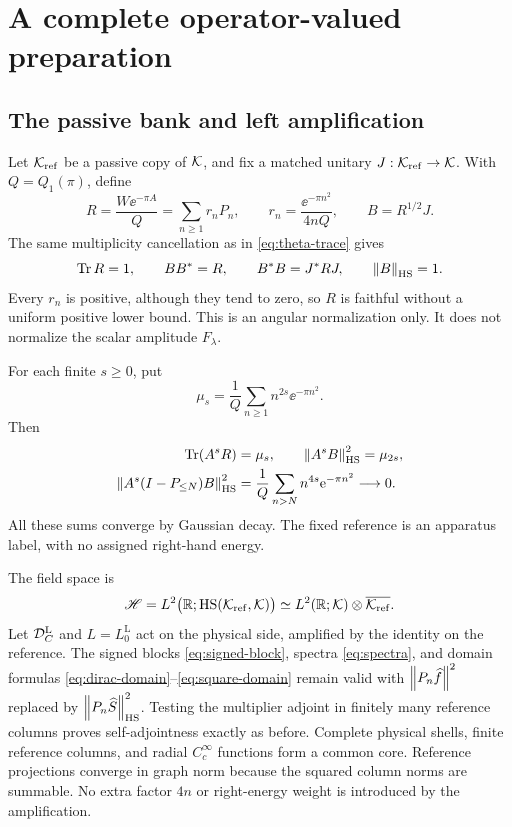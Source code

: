 \section{A complete operator-valued preparation}
\label{sec:preparation}

\subsection{The passive bank and left amplification}

Let $\mathcal K_{\mathrm{ref}}$ be a passive copy of $\mathcal K$, and fix a matched unitary
$J:\mathcal K_{\mathrm{ref}}\to\mathcal K$. With $Q=Q_1(\pi)$, define
\begin{equation}
 R=\frac{W\ee^{-\pi A}}Q=\sum_{n\ge1}r_nP_n,
 \qquad r_n=\frac{\ee^{-\pi n^2}}{4nQ},
 \qquad B=R^{1/2}J.
 \label{eq:bank}
\end{equation}
The same multiplicity cancellation as in \eqref{eq:theta-trace} gives
\begin{equation}
 \operatorname{Tr} R=1,\qquad BB^*=R,\qquad B^*B=J^*RJ,
 \qquad \left\lVert B\right\rVert_{\operatorname{HS}}=1.
 \label{eq:bank-normalization}
\end{equation}
Every $r_n$ is positive, although they tend to zero, so $R$ is faithful
without a uniform positive lower bound. This is an angular normalization
only. It does not normalize the scalar amplitude $F_\lambda$.

For each finite $s\ge0$, put
\begin{equation}
 \mu_s=\frac1Q\sum_{n\ge1}n^{2s}\ee^{-\pi n^2}.
 \label{eq:mu}
\end{equation}
Then
\begin{align}
 \operatorname{Tr}(A^sR)&=\mu_s,\qquad
 \left\lVert A^sB\right\rVert_{\operatorname{HS}}^2=\mu_{2s},
 \label{eq:bank-moments}\\
 \left\lVert A^s(I-P_{\le N})B\right\rVert_{\operatorname{HS}}^2
 &=\frac1Q\sum_{n>N}n^{4s}\mathrm e^{-\pi n^2}\longrightarrow0.
 \label{eq:bank-tail}
\end{align}
All these sums converge by Gaussian decay. The fixed reference is an
apparatus label, with no assigned right-hand energy.

The field space is
\begin{equation}
 \mathscr H=L^2\bigl(\mathbb R;\operatorname{HS}(\mathcal K_{\mathrm{ref}},\mathcal K)\bigr)
 \simeq L^2(\mathbb R;\mathcal K)\otimes\overline{\mathcal K_{\mathrm{ref}}}.
 \label{eq:amplified-space}
\end{equation}
Let $\mathcal D_C^{\mathrm L}$ and $L=L_0^{\mathrm L}$ act on the physical side,
amplified by the identity on the reference. The signed blocks
\eqref{eq:signed-block}, spectra \eqref{eq:spectra}, and domain formulas
\eqref{eq:dirac-domain}--\eqref{eq:square-domain} remain valid with
$\left\lVert P_n\widehat f\right\rVert^2$ replaced by
$\left\lVert P_n\widehat S\right\rVert_{\operatorname{HS}}^2$. Testing the multiplier adjoint in
finitely many reference columns proves self-adjointness exactly as before.
Complete physical shells, finite reference columns, and radial
$C_c^\infty$ functions form a common core. Reference projections converge
in graph norm because the squared column norms are summable. No extra
factor $4n$ or right-energy weight is introduced by the amplification.

